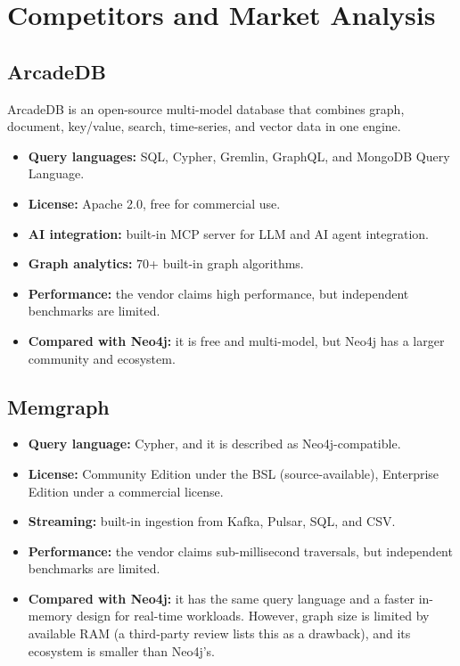 \documentclass[10pt,a4paper,twocolumn]{article}
\begin{document}
\section{Competitors and Market Analysis}

\subsection{ArcadeDB}

ArcadeDB is an open-source multi-model database that combines graph, document, key/value, search, time-series, and vector data in one engine.

\begin{itemize}
  \item \textbf{Query languages:} SQL, Cypher, Gremlin, GraphQL, and MongoDB Query Language.
  \item \textbf{License:} Apache 2.0, free for commercial use.
  \item \textbf{AI integration:} built-in MCP server for LLM and AI agent integration.
  \item \textbf{Graph analytics:} 70+ built-in graph algorithms.
  \item \textbf{Performance:} the vendor claims high performance, but independent benchmarks are limited.
  \item \textbf{Compared with Neo4j:} it is free and multi-model, but Neo4j has a larger community and ecosystem.
\end{itemize}

\subsection{Memgraph}

\begin{itemize}
  \item \textbf{Query language:} Cypher, and it is described as Neo4j-compatible.
  \item \textbf{License:} Community Edition under the BSL (source-available), Enterprise Edition under a commercial license.
  \item \textbf{Streaming:} built-in ingestion from Kafka, Pulsar, SQL, and CSV.
  \item \textbf{Performance:} the vendor claims sub-millisecond traversals, but independent benchmarks are limited.
  \item \textbf{Compared with Neo4j:} it has the same query language and a faster in-memory design for real-time workloads. However, graph size is limited by available RAM (a third-party review lists this as a drawback), and its ecosystem is smaller than Neo4j's.
\end{itemize}
\end{document}
